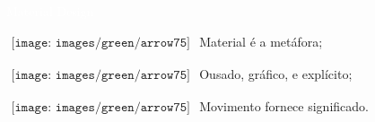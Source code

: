 
\newcommand{\PointEntry}[1]{
	$\begin{array}{l}
	{\texttt{[image: images/green/arrow75]}}
	\end{array}
	$ #1
}

\LARGE
\noindent\colorbox{materialBlue}
{\parbox[c][25pt][c]{\textwidth}{\hspace{15pt}\textcolor{white}{Material Design}}} %

\large
\vspace*{10pt}

\PointEntry{Material é a metáfora;}

\PointEntry{Ousado, gráfico, e explícito;}

\PointEntry{Movimento fornece significado.}

\vspace*{5pt}
